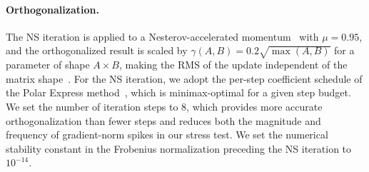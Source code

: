 \paragraph{Orthogonalization.}
\label{sec:optimizer-ns}


The NS iteration is applied to a Nesterov-accelerated momentum~\citep{jordan2024muon} with $\mu = 0.95$, and the orthogonalized result is scaled by $\gamma(A,B) = 0.2\sqrt{\max(A,B)}$ for a parameter of shape $A\times B$, making the RMS of the update independent of the matrix shape~\citep{liu2025moonlight}.
For the NS iteration, we adopt the per-step coefficient schedule of the Polar Express method~\citep{amsel2025polarexpress}, which is minimax-optimal for a given step budget. 
We set the number of iteration steps to $8$, which provides more accurate orthogonalization than fewer steps and reduces both the magnitude and frequency of gradient-norm spikes in our stress test.
We set the numerical stability constant in the Frobenius normalization preceding the NS iteration to $10^{-14}$.


